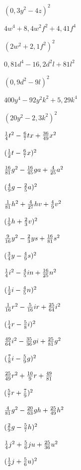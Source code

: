 \documentclass[
  ngerman,
]{book}
\begin{document}
\leavevmode\hypertarget{toggleText107}{}%
\((0,3y^2-4z)^2\)

\(4w^4+8,4w^2f^2+4,41f^4\)

\leavevmode\hypertarget{toggleText108}{}%
\((2w^2+2,1f^2)^2\)

\(0,81d^4-16,2d^2l+81l^2\)

\leavevmode\hypertarget{toggleText109}{}%
\((0,9d^2-9l)^2\)

\(400y^4-92y^2k^2+5,29k^4\)

\leavevmode\hypertarget{toggleText110}{}%
\((20y^2-2,3k^2)^2\)

\({1 \over 4}t^2-{6 \over 7}tx+{36 \over 49}x^2\)

\leavevmode\hypertarget{toggleText111}{}%
\(({1 \over 2}t-{6 \over 7}x)^2\)

\({16 \over 81}g^2-{16 \over 45}ga+{4 \over 25}a^2\)

\leavevmode\hypertarget{toggleText112}{}%
\(({4 \over 9}g-{2 \over 5}a)^2\)

\({1 \over 81}h^2+{4 \over 27}hv+{4 \over 9}v^2\)

\leavevmode\hypertarget{toggleText113}{}%
\(({1 \over 9}h+{2 \over 3}v)^2\)

\({9 \over 16}y^2-{2 \over 3}ys+{16 \over 81}s^2\)

\leavevmode\hypertarget{toggleText114}{}%
\(({3 \over 4}y-{4 \over 9}s)^2\)

\({1 \over 4}i^2-{4 \over 5}in+{16 \over 25}n^2\)

\leavevmode\hypertarget{toggleText115}{}%
\(({1 \over 2}i-{4 \over 5}n)^2\)

\({1 \over 16}r^2-{5 \over 16}ir+{25 \over 64}i^2\)

\leavevmode\hypertarget{toggleText116}{}%
\(({1 \over 4}r-{5 \over 8}i)^2\)

\({49 \over 64}i^2-{35 \over 36}gi+{25 \over 81}g^2\)

\leavevmode\hypertarget{toggleText117}{}%
\(({7 \over 8}i-{5 \over 9}g)^2\)

\({25 \over 49}r^2+{10 \over 9}r+{49 \over 81}\)

\leavevmode\hypertarget{toggleText118}{}%
\(({5 \over 7}r+{7 \over 9})^2\)

\({4 \over 81}g^2-{20 \over 63}gh+{25 \over 49}h^2\)

\leavevmode\hypertarget{toggleText119}{}%
\(({2 \over 9}g-{5 \over 7}h)^2\)

\({1 \over 4}j^2+{5 \over 6}ju+{25 \over 36}u^2\)

\leavevmode\hypertarget{toggleText120}{}%
\(({1 \over 2}j+{5 \over 6}u)^2\)
\end{document}
